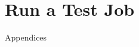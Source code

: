 \documentclass[letterpaper]{article}
\begin{document}
\section{Run a Test Job} \label{sec:test_job}


\clearpage
\appendix
{\bf \LARGE \centerline{Appendices}} \vspace*{0.2cm}

\renewcommand{\thesubsection}{\Alph{subsection}}





\end{document}
